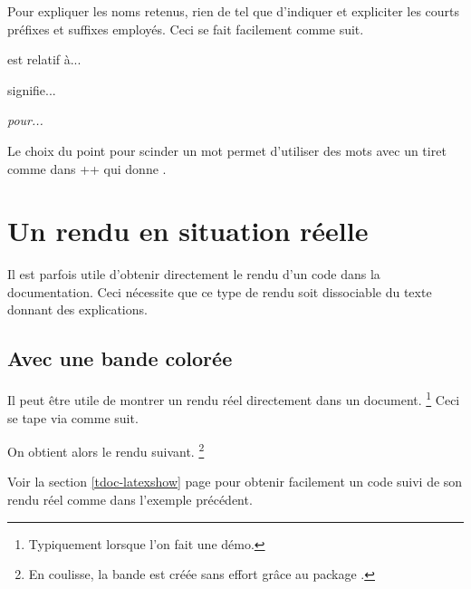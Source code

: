 Pour expliquer les noms retenus, rien de tel que d'indiquer et expliciter les courts préfixes et suffixes employés. Ceci se fait facilement comme suit.


\begin{tdoclatex}[sbs]
 est relatif à...

 signifie...

\emph{ pour...}
\end{tdoclatex}


\begin{tdocrem}
    Le choix du point pour scinder un mot permet d'utiliser des mots avec un tiret comme dans \tdocinlatex++ qui donne .
\end{tdocrem}


\section{Un rendu en situation réelle} \label{tdoc-showcase}

Il est parfois utile d'obtenir directement le rendu d'un code dans la documentation. Ceci nécessite que ce type de rendu soit dissociable du texte donnant des explications.




\subsection{Avec une bande colorée}

\begin{tdocexa}
    Il peut être utile de montrer un rendu réel directement dans un document.
    \footnote{
        Typiquement lorsque l'on fait une démo.
    }
    Ceci se tape via  comme suit.



    On obtient alors le rendu suivant.
    \footnote{
        En coulisse, la bande est créée sans effort grâce au package .
    }

    \medskip

    

\end{tdocexa}


\begin{tdocrem}
    Voir la section \ref{tdoc-latexshow} page \pageref{tdoc-latexshow} pour obtenir facilement un code suivi de son rendu réel comme dans l'exemple précédent.
\end{tdocrem}


